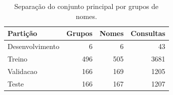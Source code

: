 \begin{table}[tb]
\caption{Separação do conjunto principal por grupos de nomes.}
\label{tab:particoes}
\centering
\small
\setlength{\tabcolsep}{3pt}
\begin{tabular}{lrrr}
\toprule
Partição & Grupos & Nomes & Consultas \\
\midrule
Desenvolvimento & 6 & 6 & 43 \\
Treino & 496 & 505 & 3681 \\
Validacao & 166 & 169 & 1205 \\
Teste & 166 & 167 & 1207 \\
\bottomrule
\end{tabular}

\end{table}
